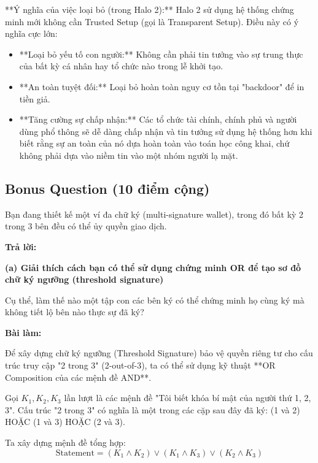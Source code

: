 **Ý nghĩa của việc loại bỏ (trong Halo 2):**
Halo 2 sử dụng hệ thống chứng minh mới không cần Trusted Setup (gọi là Transparent Setup). Điều này có ý nghĩa cực lớn:
\begin{itemize}
    \item **Loại bỏ yếu tố con người:** Không cần phải tin tưởng vào sự trung thực của bất kỳ cá nhân hay tổ chức nào trong lễ khởi tạo.
    \item **An toàn tuyệt đối:** Loại bỏ hoàn toàn nguy cơ tồn tại "backdoor" để in tiền giả.
    \item **Tăng cường sự chấp nhận:** Các tổ chức tài chính, chính phủ và người dùng phổ thông sẽ dễ dàng chấp nhận và tin tưởng sử dụng hệ thống hơn khi biết rằng sự an toàn của nó dựa hoàn toàn vào toán học công khai, chứ không phải dựa vào niềm tin vào một nhóm người lạ mặt.
\end{itemize}

\vspace{0.5cm}

\subsection{Bonus Question (10 điểm cộng)}

Bạn đang thiết kế một ví đa chữ ký (multi-signature wallet), trong đó bất kỳ 2 trong 3 bên đều có thể ủy quyền giao dịch.

\begin{center}
    \textbf{Trả lời:}
\end{center}

\textbf{(a) Giải thích cách bạn có thể sử dụng chứng minh OR để tạo sơ đồ chữ ký ngưỡng (threshold signature)}

Cụ thể, làm thế nào một tập con các bên ký có thể chứng minh họ cùng ký mà không tiết lộ bên nào thực sự đã ký?

\textbf{Bài làm:}

Để xây dựng chữ ký ngưỡng (Threshold Signature) bảo vệ quyền riêng tư cho cấu trúc truy cập "2 trong 3" (2-out-of-3), ta có thể sử dụng kỹ thuật **OR Composition của các mệnh đề AND**.

Gọi $K_1, K_2, K_3$ lần lượt là các mệnh đề "Tôi biết khóa bí mật của người thứ 1, 2, 3".
Cấu trúc "2 trong 3" có nghĩa là một trong các cặp sau đây đã ký: (1 và 2) HOẶC (1 và 3) HOẶC (2 và 3).

Ta xây dựng mệnh đề tổng hợp:
\[
\text{Statement} = (K_1 \land K_2) \lor (K_1 \land K_3) \lor (K_2 \land K_3)
\]

